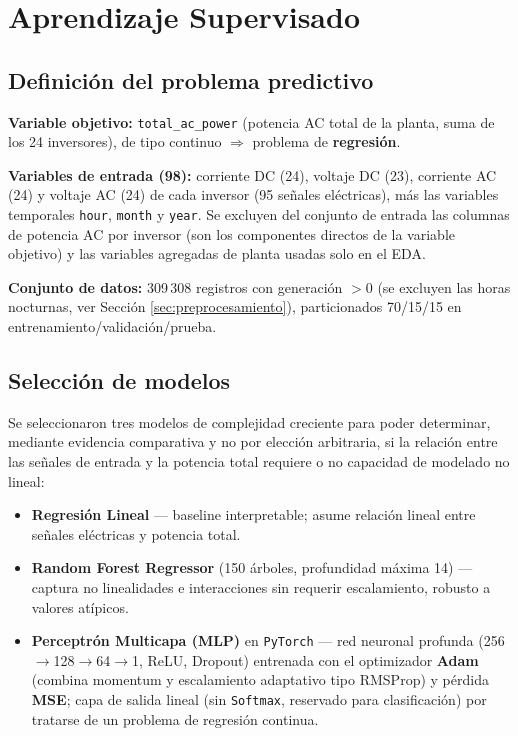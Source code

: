 \section{Aprendizaje Supervisado}
\label{sec:supervisado}

\subsection*{Definición del problema predictivo}

\textbf{Variable objetivo:} \texttt{total\_ac\_power} (potencia AC total de la planta, suma de los 24 inversores), de tipo continuo $\Rightarrow$ problema de \textbf{regresión}.

\textbf{Variables de entrada (98):} corriente DC (24), voltaje DC (23), corriente AC (24) y voltaje AC (24) de cada inversor (95 señales eléctricas), más las variables temporales \texttt{hour}, \texttt{month} y \texttt{year}. Se excluyen del conjunto de entrada las columnas de potencia AC por inversor (son los componentes directos de la variable objetivo) y las variables agregadas de planta usadas solo en el EDA.

\textbf{Conjunto de datos:} 309\,308 registros con generación $>0$ (se excluyen las horas nocturnas, ver Sección \ref{sec:preprocesamiento}), particionados 70/15/15 en entrenamiento/validación/prueba.

\subsection*{Selección de modelos}

Se seleccionaron tres modelos de complejidad creciente para poder determinar, mediante evidencia comparativa y no por elección arbitraria, si la relación entre las señales de entrada y la potencia total requiere o no capacidad de modelado no lineal:

\begin{itemize}
    \item \textbf{Regresión Lineal} — baseline interpretable; asume relación lineal entre señales eléctricas y potencia total.
    \item \textbf{Random Forest Regressor} (150 árboles, profundidad máxima 14) — captura no linealidades e interacciones sin requerir escalamiento, robusto a valores atípicos.
    \item \textbf{Perceptrón Multicapa (MLP)} en \texttt{PyTorch} — red neuronal profunda (256$\to$128$\to$64$\to$1, ReLU, Dropout) entrenada con el optimizador \textbf{Adam} (combina momentum y escalamiento adaptativo tipo RMSProp) y pérdida \textbf{MSE}; capa de salida lineal (sin \texttt{Softmax}, reservado para clasificación) por tratarse de un problema de regresión continua.
\end{itemize}

